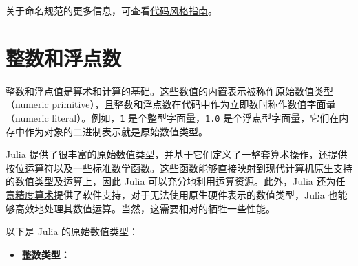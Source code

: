 关于命名规范的更多信息，可查看\hyperlink{12507952184948113283}{代码风格指南}。



\hypertarget{9431281250101057989}{}


\chapter{整数和浮点数}



整数和浮点值是算术和计算的基础。这些数值的内置表示被称作原始数值类型（numeric primitive），且整数和浮点数在代码中作为立即数时称作数值字面量（numeric literal）。例如，\texttt{1} 是个整型字面量，\texttt{1.0} 是个浮点型字面量，它们在内存中作为对象的二进制表示就是原始数值类型。



Julia 提供了很丰富的原始数值类型，并基于它们定义了一整套算术操作，还提供按位运算符以及一些标准数学函数。这些函数能够直接映射到现代计算机原生支持的数值类型及运算上，因此 Julia 可以充分地利用运算资源。此外，Julia 还为\hyperlink{7537478913062818871}{任意精度算术}提供了软件支持，对于无法使用原生硬件表示的数值类型，Julia 也能够高效地处理其数值运算。当然，这需要相对的牺牲一些性能。



以下是 Julia 的原始数值类型：



\begin{itemize}
\item \textbf{整数类型：}

\end{itemize}



